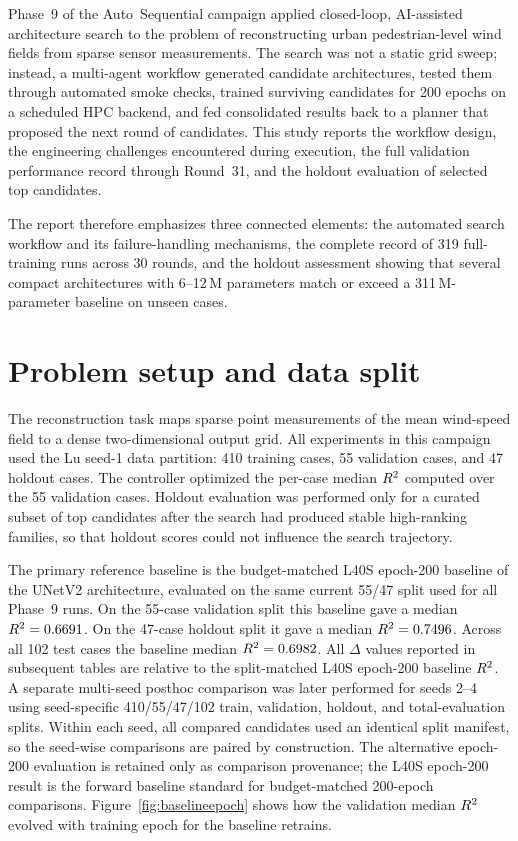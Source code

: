 ﻿\documentclass[preprint,12pt,authoryear]{elsarticle}
\newcommand{\rTwo}{R\textsuperscript{2}}
\begin{document}
Phase~9 of the Auto~Sequential campaign applied closed-loop, AI-assisted architecture search to the problem of reconstructing urban pedestrian-level wind fields from sparse sensor measurements.
The search was not a static grid sweep; instead, a multi-agent workflow generated candidate architectures, tested them through automated smoke checks, trained surviving candidates for 200 epochs on a scheduled HPC backend, and fed consolidated results back to a planner that proposed the next round of candidates.
This study reports the workflow design, the engineering challenges encountered during execution, the full validation performance record through Round~31, and the holdout evaluation of selected top candidates.

The report therefore emphasizes three connected elements: the automated search workflow and its failure-handling mechanisms, the complete record of 319 full-training runs across 30 rounds, and the holdout assessment showing that several compact architectures with 6--12\,M parameters match or exceed a 311\,M-parameter baseline on unseen cases.

\section{Problem setup and data split}
\label{sec:data}

The reconstruction task maps sparse point measurements of the mean wind-speed field to a dense two-dimensional output grid.
All experiments in this campaign used the Lu seed-1 data partition: 410 training cases, 55 validation cases, and 47 holdout cases.
The controller optimized the per-case median $\rTwo{}$ computed over the 55 validation cases.
Holdout evaluation was performed only for a curated subset of top candidates after the search had produced stable high-ranking families, so that holdout scores could not influence the search trajectory.

The primary reference baseline is the budget-matched L40S epoch-200 baseline of the UNetV2 architecture, evaluated on the same current 55/47 split used for all Phase~9 runs.
On the 55-case validation split this baseline gave a median $\rTwo{} = 0.6691$.
On the 47-case holdout split it gave a median $\rTwo{} = 0.7496$.
Across all 102 test cases the baseline median $\rTwo{} = 0.6982$.
All $\Delta$ values reported in subsequent tables are relative to the split-matched L40S epoch-200 baseline $\rTwo{}$.
A separate multi-seed posthoc comparison was later performed for seeds 2--4 using seed-specific 410/55/47/102 train, validation, holdout, and total-evaluation splits. Within each seed, all compared candidates used an identical split manifest, so the seed-wise comparisons are paired by construction.
The alternative epoch-200 evaluation is retained only as comparison provenance; the L40S epoch-200 result is the forward baseline standard for budget-matched 200-epoch comparisons.
Figure~\ref{fig:baselineepoch} shows how the validation median $\rTwo{}$ evolved with training epoch for the baseline retrains.
\end{document}
